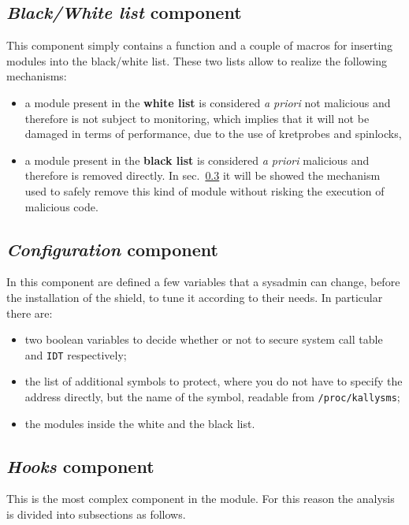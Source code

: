 \documentclass{article}
\begin{document}
	\subsection{\emph{Black/White list} component}\label{sec:bwlist}
	This component simply contains a function and a couple of macros for inserting modules into the black/white list.
	These two lists allow to realize the following mechanisms:
	\begin{itemize}
		\item a module present in the \textbf{white list} is considered \textit{a priori} not malicious and therefore
		is not subject to monitoring, which implies that it will not be damaged in terms of performance, due to the use
		of kretprobes and spinlocks,
		\item a module present in the \textbf{black list} is considered \textit{a priori} malicious and therefore is
		removed directly. In sec.~\ref{sec:hooks} it will be showed the mechanism used to safely remove this kind of
		module without risking the execution of malicious code.
	\end{itemize}

	\subsection{\emph{Configuration} component}\label{sec:config}
	In this component are defined a few variables that a sysadmin can change, before the installation of the
	shield, to tune it according to their needs. In particular there are:
	\begin{itemize}
		\item two boolean variables to decide whether or not to secure system call table and \texttt{IDT} respectively;
		\item the list of additional symbols to protect, where you do not have to specify the address directly,
		but the name of the symbol, readable from \texttt{/proc/kallysms};
		\item the modules inside the white and the black list.
	\end{itemize}

	\subsection{\emph{Hooks} component}\label{sec:hooks}
	This is the most complex component in the module. For this reason the analysis is divided into subsections as
	follows.
\end{document}
